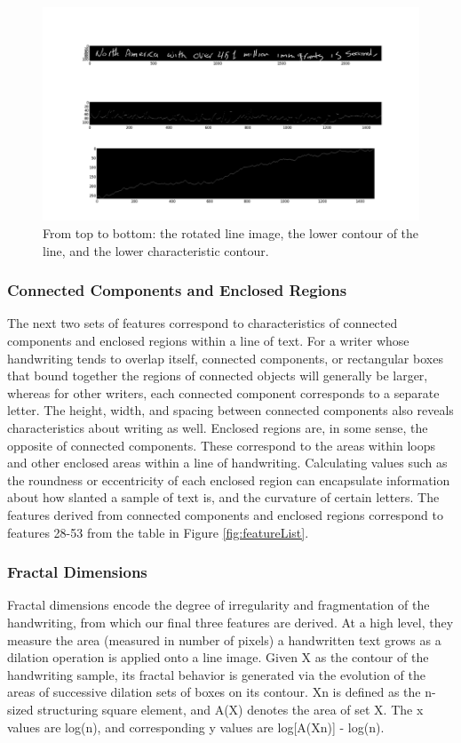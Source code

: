 \documentclass[paper=a4, fontsize=11pt]{scrartcl} %
\numberwithin{equation}{section} %
\numberwithin{figure}{section} %
\numberwithin{table}{section} %
\begin{document}
\begin{figure}
  \centering \includegraphics{contourimage.png}
  \caption{From top to bottom: the rotated line image, the lower
    contour of the line, and the lower characteristic contour.}
  \label{fig:contourimage}
\end{figure}

\subsubsection{Connected Components and Enclosed Regions}
The next two sets of features correspond to characteristics of
connected components and enclosed regions within a line of text. For a
writer whose handwriting tends to overlap itself, connected
components, or rectangular boxes that bound together the regions of
connected objects will generally be larger, whereas for other writers,
each connected component corresponds to a separate letter. The height,
width, and spacing between connected components also reveals
characteristics about writing as well. Enclosed regions are, in some
sense, the opposite of connected components. These correspond to the
areas within loops and other enclosed areas within a line of
handwriting. Calculating values such as the roundness or eccentricity
of each enclosed region can encapsulate information about how slanted
a sample of text is, and the curvature of certain letters. The
features derived from connected components and enclosed regions
correspond to features 28-53 from the table in Figure
\ref{fig:featureList}.

\subsubsection{Fractal Dimensions}
Fractal dimensions encode the degree of irregularity and fragmentation
of the handwriting, from which our final three features are
derived\cite{FractalDimensions}. At a high level, they measure the
area (measured in number of pixels) a handwritten text grows as a
dilation operation is applied onto a line image. Given X as the
contour of the handwriting sample, its fractal behavior is generated
via the evolution of the areas of successive dilation sets of boxes on
its contour. Xn is defined as the n-sized structuring square element,
and A(X) denotes the area of set X. The x values are log(n), and
corresponding y values are log[A(Xn)] - log(n).
\end{document}
